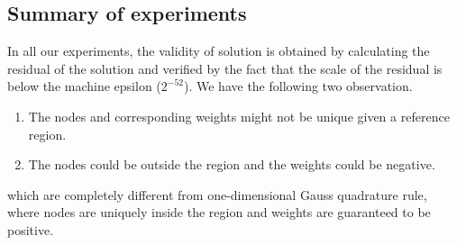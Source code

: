 \documentclass[conference,onecolumn, 12pt]{IEEEtran}
\begin{document}
\subsection{Summary of experiments}
In all our experiments, the validity of solution is obtained by calculating the residual of the solution and verified by the fact that the scale of the residual is below the machine epsilon ($2^{-52}$). We have the following two observation.
\begin{enumerate}
    \item The nodes and corresponding weights might not be unique given a reference region. 
    \item The nodes could be outside the region and the weights could be negative.
\end{enumerate} 
which are completely different from one-dimensional Gauss quadrature rule, where nodes are uniquely inside the region and weights are guaranteed to be positive.
\end{document}
